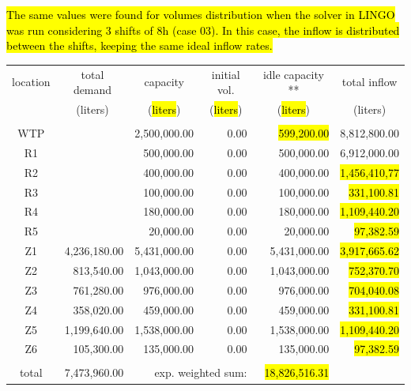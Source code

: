 \documentclass{singlecol}
\theoremstyle{TH}{
\newtheorem{lemma}{Lemma}
\newtheorem{theorem}[lemma]{Theorem}
\newtheorem{corrolary}[lemma]{Corrolary}
\newtheorem{conjecture}[lemma]{Conjecture}
\newtheorem{proposition}[lemma]{Proposition}
\newtheorem{claim}[lemma]{Claim}
\newtheorem{stheorem}[lemma]{Wrong Theorem}
\newtheorem{algorithm}{Algorithm}
}
\theoremstyle{THrm}{
\newtheorem{definition}{Definition}[section]
\newtheorem{question}{Question}[section]
\newtheorem{remark}{Remark}
\newtheorem{scheme}{Scheme}
}
\theoremstyle{THhit}{
\newtheorem{case}{Case}[section]
}
\begin{document}
\hl{The same values were found for volumes distribution when the solver in LINGO was run considering 3 shifts of 8h (case 03). In this case, the inflow is distributed between the shifts, keeping the same ideal inflow rates.}

\begin{table}[t]
\begin{center}
\begin{small}
	\begin{tabular}{ c r r r r r } 
		location & \multicolumn{1}{c}{total demand}      & \multicolumn{1}{c}{capacity} & \multicolumn{1}{c}{initial vol.} & \multicolumn{1}{c}{idle capacity **} & \multicolumn{1}{c}{total inflow}  \\
		      & \multicolumn{1}{c}{(liters)} & \multicolumn{1}{c}{(\hl{liters})}   & \multicolumn{1}{c}{(\hl{liters})}     &  \multicolumn{1}{c}{(\hl{liters})}   &  \multicolumn{1}{c}{(liters)}               \\
		\\
		WTP   &              & 2,500,000.00 & 0.00 &  \hl{599,200.00} & 8,812,800.00 \\
		R1    &              &   500,000.00 & 0.00 &    500,000.00 & 6,912,000.00 \\
		R2    &              &   400,000.00 & 0.00 &    400,000.00 & \hl{1,456,410,77} \\
		R3    &              &   100,000.00 & 0.00 &    100,000.00 &   \hl{331,100.81} \\
	    R4    &              &   180,000.00 & 0.00 &    180,000.00 & \hl{1,109,440.20} \\
	    R5    &              &    20,000.00 & 0.00 &     20,000.00 &    \hl{97,382.59} \\
	    Z1    & 4,236,180.00 & 5,431,000.00 & 0.00 &  5,431,000.00 & \hl{3,917,665.62} \\
	    Z2    &   813,540.00 & 1,043,000.00 & 0.00 &  1,043,000.00 &   \hl{752,370.70} \\
	    Z3    &   761,280.00 &   976,000.00 & 0.00 &    976,000.00 &   \hl{704,040.08} \\
	    Z4    &   358,020.00 &   459,000.00 & 0.00 &    459,000.00 &   \hl{331,100.81} \\
	    Z5    & 1,199,640.00 & 1,538,000.00 & 0.00 &  1,538,000.00 & \hl{1,109,440.20} \\
	    Z6    &   105,300.00 &   135,000.00 & 0.00 &    135,000.00 &    \hl{97,382.59} \\
	    \\
	    total & 7,473,960.00 & \multicolumn{2}{r}{exp. weighted sum:} & \hl{18,826,516.31} &              \\

\end{tabular}
\end{small}
\end{center}
\end{table}
\end{document}
